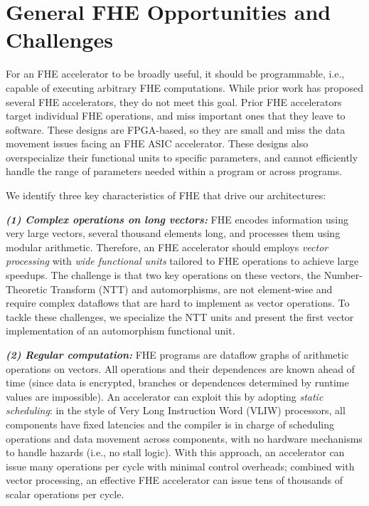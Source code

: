 \section{General FHE Opportunities and Challenges}
\label{sec:general}

For an FHE accelerator to be broadly useful, it should be programmable, i.e.,
capable of executing arbitrary FHE computations. While prior work has proposed
several FHE accelerators, they do not meet this goal. Prior FHE
accelerators~\cite{cousins:hpec14:fpga-he,cousins:tetc17:fpga-he,doroz:tc15:accelerating-fhe,roy:hpca19:fpga-he,riazi:asplos20:heax,turan:tc20:heaws}
target individual FHE operations, and miss important ones that they leave to
software. These designs are FPGA-based, so they are small and miss the data
movement issues facing an FHE ASIC accelerator. These designs also
overspecialize their functional units to specific parameters, and cannot
efficiently handle the range of parameters needed within a program or across
programs.

We identify three key characteristics of FHE that drive our architectures:

\noindent \textbf{\emph{(1) Complex operations on long vectors:}}
FHE encodes information using very large vectors, several thousand elements
long, and processes them using modular arithmetic. Therefore, an FHE accelerator should employs \emph{vector
processing} with \emph{wide functional units} tailored to FHE operations to
achieve large speedups. The challenge is that two key operations on these
vectors, the Number-Theoretic Transform (NTT) and automorphisms, are not
element-wise and require complex dataflows that are hard to implement as vector
operations. To tackle these challenges, we specialize the NTT units and present
the first vector implementation of an automorphism functional unit.

\noindent \textbf{\emph{(2) Regular computation:}}
FHE programs are dataflow graphs of arithmetic operations on vectors. All
operations and their dependences are known ahead of time (since data is
encrypted, branches or dependences determined by runtime values are
impossible). An accelerator can exploit this by adopting \emph{static
scheduling}: in the style of Very Long Instruction Word (VLIW) processors, all
components have fixed latencies and the compiler is in charge of scheduling
operations and data movement across components, with no hardware mechanisms to
handle hazards (i.e., no stall logic). With this approach, an accelerator can
issue many operations per cycle with minimal control overheads; combined with
vector processing, an effective FHE accelerator can issue tens of thousands of
scalar operations per cycle.


